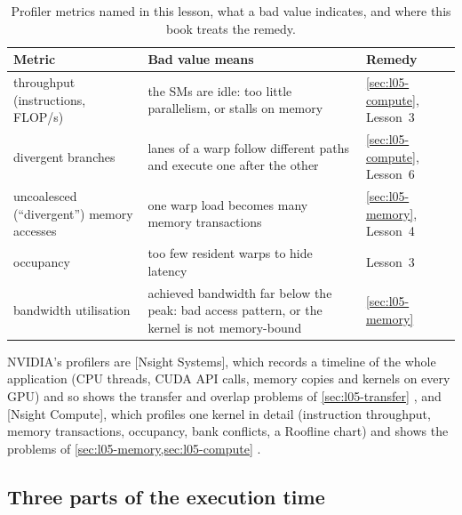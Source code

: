 \documentclass[../main.tex]{subfiles}
\begin{document}
\begin{table}[tb]
  \centering
  \small
  \caption{Profiler metrics named in this lesson, what a bad value
    indicates, and where this book treats the remedy.}
  \label{tab:l05-metrics}
  \begin{tabular}{>{\raggedright\arraybackslash}p{28mm}
                  >{\raggedright\arraybackslash}p{52mm}
                  >{\raggedright\arraybackslash}p{26mm}}
    \toprule
    Metric & Bad value means & Remedy \\
    \midrule
    throughput (instructions, FLOP/s) & the SMs are idle: too little
      parallelism, or stalls on memory & \cref{sec:l05-compute}, Lesson~3 \\
    divergent branches & lanes of a warp follow different paths and
      execute one after the other & \cref{sec:l05-compute}, Lesson~6 \\
    uncoalesced (\enquote{divergent}) memory accesses & one warp load
      becomes many memory transactions & \cref{sec:l05-memory}, Lesson~4 \\
    occupancy & too few resident warps to hide latency & Lesson~3 \\
    bandwidth utilisation & achieved bandwidth far below the peak:
      bad access pattern, or the kernel is not memory-bound &
      \cref{sec:l05-memory} \\
    \bottomrule
  \end{tabular}
\end{table}

\begin{definition}
  NVIDIA's profilers are [Nsight Systems], which
  records a timeline of the whole application (CPU threads, CUDA API
  calls, memory copies and kernels on every GPU) and so shows the
  transfer and overlap problems of \cref{sec:l05-transfer}
  \cite{nvidia2026nsightsystems}, and [Nsight Compute],
  which profiles one kernel in detail (instruction throughput, memory
  transactions, occupancy, bank conflicts, a Roofline chart) and shows
  the problems of \cref{sec:l05-memory,sec:l05-compute}
  \cite{nvidia2026nsightcompute}.
\end{definition}

\subsection{Three parts of the execution time}
\end{document}
